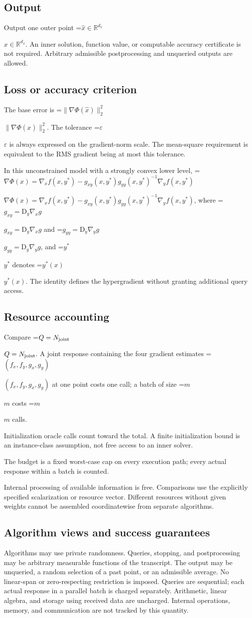 \documentclass[10pt,a4paper]{article}
\newcommand{\AtlasMath}[1]{\par\begingroup\centering\setbox0=\hbox{$\displaystyle #1$}\ifdim\wd0>1.4\linewidth\typeout{ATLAS WIDE FORMULA: \the\wd0}\fi\ifdim\wd0>\linewidth\resizebox{\linewidth}{!}{\box0}\else\box0\fi\par\endgroup}
\newcommand{\AtlasInlineMath}[1]{\begingroup\setbox0=\hbox{$#1$}\ifdim\wd0>.4\linewidth\endgroup\AtlasMath{#1}\else\endgroup$#1$\fi}
\begin{document}
\subsection{Output}
Output one outer point \AtlasInlineMath{\widehat{x}\in\mathbb{R}^{d_x}}. An inner solution, function value, or computable accuracy certificate is not required. Arbitrary admissible postprocessing and unqueried outputs are allowed.

\subsection{Loss or accuracy criterion}
The base error is \AtlasInlineMath{\|\nabla\Phi(\widehat{x})\|_2^2}. The tolerance \AtlasInlineMath{\varepsilon} is always expressed on the gradient-norm scale. The mean-square requirement is equivalent to the RMS gradient being at most this tolerance.

In this unconstrained model with a strongly convex lower level, \AtlasInlineMath{\nabla\Phi(x)=\nabla_x f(x,y^*)-g_{xy}(x,y^*)g_{yy}(x,y^*)^{-1}\nabla_y f(x,y^*)}, where \AtlasInlineMath{g_{xy}=\mathrm{D}_y\nabla_x g} and \AtlasInlineMath{g_{yy}=\mathrm{D}_y\nabla_y g}, and \AtlasInlineMath{y^*} denotes \AtlasInlineMath{y^*(x)}. The identity defines the hypergradient without granting additional query access.

\subsection{Resource accounting}
Compare \AtlasInlineMath{Q=N_{\rm joint}}. A joint response containing the four gradient estimates \AtlasInlineMath{(f_x,f_y,g_x,g_y)} at one point costs one call; a batch of size \AtlasInlineMath{m} costs \AtlasInlineMath{m} calls.

Initialization oracle calls count toward the total. A finite initialization bound is an instance-class assumption, not free access to an inner solver.

The budget is a fixed worst-case cap on every execution path; every actual response within a batch is counted.

Internal processing of available information is free. Comparisons use the explicitly specified scalarization or resource vector. Different resources without given weights cannot be assembled coordinatewise from separate algorithms.

\subsection{Algorithm views and success guarantees}
Algorithms may use private randomness. Queries, stopping, and postprocessing may be arbitrary measurable functions of the transcript. The output may be unqueried, a random selection of a past point, or an admissible average. No linear-span or zero-respecting restriction is imposed. Queries are sequential; each actual response in a parallel batch is charged separately. Arithmetic, linear algebra, and storage using received data are uncharged. Internal operations, memory, and communication are not tracked by this quantity.
\end{document}
